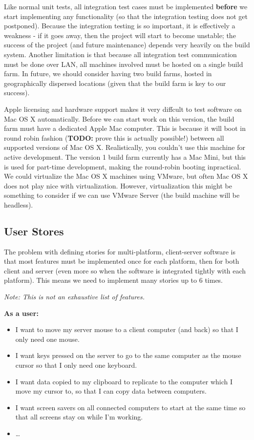 Like normal unit tests, all integration test cases must be implemented 
\textbf{before} we start implementing any functionality (so that the integration
testing does not get postponed). Because the integration testing is so 
important, it is effectively a weakness - if it goes away, then the project will
start to become unstable; the success of the project (and future maintenance) 
depends very heavily on the build system. Another limitation is that because
all integration test communication must be done over LAN, all machines involved
must be hosted on a single build farm. In future, we should consider having two
build farms, hosted in geographically dispersed locations (given that the build
farm is key to our success).

Apple licensing and hardware support makes it very diffcult to test software on
Mac OS X automatically. Before we can start work on this version, the build farm
must have a dedicated Apple Mac computer. This is because it will boot in round
robin fashion (\textbf{TODO:} prove this is actually possible!) between all 
supported versions of Mac OS X. Realistically, you couldn't use this machine 
for active development. The version 1 build farm currently has a Mac Mini, but
this is used for part-time development, making the round-robin booting
inpractical. We could virtualize the Mac OS X machines using VMware, but often
Mac OS X does not play nice with virtualization. However, virtualization this 
might be something to consider if we can use VMware Server (the build machine
will be headless).

\subsection{User Stores}

The problem with defining stories for multi-platform, client-server software
is that most features must be implemented once for each platform, then for both
client and server (even more so when the software is integrated tightly with
each platform). This means we need to implement many stories up to 6 times.

\textit{Note: This is not an exhaustive list of features.}

\textbf{As a user:}

\begin{itemize}
  \item I want to move my server mouse to a client computer (and back) so that 
    I only need one mouse.
  \item I want keys pressed on the server to go to the same computer as the
    mouse cursor so that I only need one keyboard.
  \item I want data copied to my clipboard to replicate to the computer which
    I move my cursor to, so that I can copy data between computers.
  \item I want screen savers on all connected computers to start at the same
    time so that all screens stay on while I'm working.
  \item \ldots
\end{itemize}

